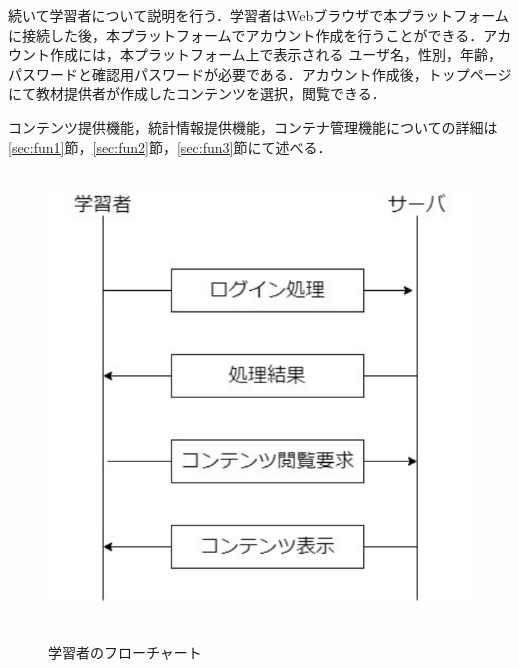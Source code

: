 \newpage
続いて学習者について説明を行う．学習者はWebブラウザで本プラットフォームに接続した後，本プラットフォームでアカウント作成を行うことができる．アカウント作成には，本プラットフォーム上で表示される
ユーザ名，性別，年齢，パスワードと確認用パスワードが必要である．アカウント作成後，トップページにて教材提供者が作成したコンテンツを選択，閲覧できる．

コンテンツ提供機能，統計情報提供機能，コンテナ管理機能についての詳細は\ref{sec:fun1}節，\ref{sec:fun2}節，\ref{sec:fun3}節にて述べる．

\begin{figure}[htbp]
    \begin{center}
        \includegraphics[width=13cm,height=12cm,keepaspectratio]{learn_flow-crop.pdf}\\
    \end{center}
    \caption{学習者のフローチャート}
    \label{learn_flow}
\end{figure}